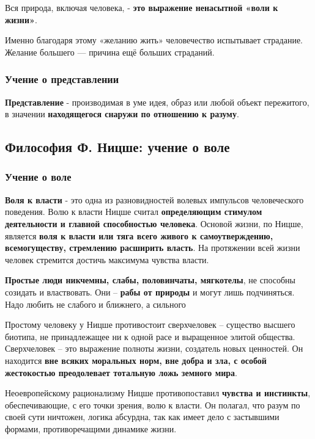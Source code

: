\documentclass{article}
\begin{document}
\begin{flushleft}
Вся природа, включая человека, - \textbf{это выражение ненасытной «воли к жизни»}.

Именно благодаря этому «желанию жить» человечество испытывает страдание. Желание большего — причина ещё больших страданий.

\subsubsection{Учение о представлении}

\textbf{Представление} - производимая в уме идея, образ или любой объект пережитого, в значении \textbf{находящегося снаружи по отношению к разуму}.

\pagebreak
\subsection{Философия Ф. Ницше: учение о воле}

\subsubsection{Учение о воле}

\textbf{Воля к власти} - это одна из разновидностей волевых импульсов человеческого поведения. Волю к власти Ницше считал \textbf{определяющим стимулом деятельности и главной способностью человека}. Основой жизни, по Ницше, является \textbf{воля к власти или тяга всего живого к самоутверждению, всемогуществу, стремлению расширить власть}. На протяжении всей жизни человек стремится достичь максимума чувства власти.

\textbf{Простые люди никчемны, слабы, половинчаты, мягкотелы}, не способны созидать и властвовать. Они – \textbf{рабы от природы} и могут лишь подчиняться. Надо любить не слабого и ближнего, а сильного

Простому человеку у Ницше противостоит сверхчеловек – существо высшего биотипа, не принадлежащее ни к одной расе и выращенное элитой общества. Сверхчеловек – это выражение полноты жизни, создатель новых ценностей. Он находится \textbf{вне всяких моральных норм, вне добра и зла, с особой жестокостью преодолевает тотальную ложь земного мира}.

Неоевропейскому рационализму Ницше противопоставил \textbf{чувства и инстинкты}, обеспечивающие, с его точки зрения, волю к власти. Он полагал, что разум по своей сути ничтожен, логика абсурдна, так как имеет дело с застывшими формами, противоречащими динамике жизни.


\end{flushleft}
\end{document}
